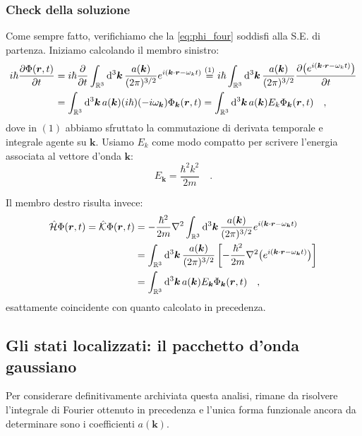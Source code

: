 \subsubsection{Check della soluzione}
Come sempre fatto, verifichiamo che la \eqref{eq:phi_four} soddisfi alla S.E. di partenza. Iniziamo calcolando il membro sinistro:
\[
\begin{aligned}
    i\hbar \pdv{\Phi(\bm{r}, t)}{t} &= i\hbar \pdv{}{t} \int_{\mathbb{R}^3} \dd^3{\bm{k}} \, \frac{a(\bm{k})}{(2\pi)^{3/2}} e^{i(\bm{k} \cdot \bm{r}-\omega_k t)} \overset{(1)}{=} i\hbar \int_{\mathbb{R}^3} \dd^3{\bm{k}} \, \frac{a(\bm{k})}{(2\pi)^{3/2}} \pdv{\big( e^{i(\bm{k} \cdot \bm{r}-\omega_k t)} \big)}{t} \\
    &= \int_{\mathbb{R}^3} \dd^3{\bm{k}} \, a(\bm{k}) (i\hbar )(-i\omega_{\bm{k}}) \Phi_{\bm{k}}(\bm{r}, t) = \int_{\mathbb{R}^3} \dd^3{\bm{k}} \, a(\bm{k}) E_k \Phi_{\bm{k}}(\bm{r}, t) \quad,
\end{aligned}
\]
dove in $(1)$ abbiamo sfruttato la commutazione di derivata temporale e integrale agente su $\bm{k}$. Usiamo $E_k$ come modo compatto per scrivere l'energia associata al vettore d'onda $\bm{k}$:
\[
    E_{\bm{k}} = \frac{\hbar^2 k^2}{2m} \quad.
\]

Il membro destro risulta invece:
\[
\begin{aligned}
    \hat{\mathcal{H}}\Phi(\bm{r}, t) = \hat{\mathcal{K}}\Phi(\bm{r}, t) &= -\frac{\hbar^2}{2m}\nabla^2 \int_{\mathbb{R}^3} \dd^3{\bm{k}} \, \frac{a(\bm{k})}{(2\pi)^{3/2}} e^{i(\bm{k} \cdot \bm{r}-\omega_{\bm{k}} t)}\\
    & = \int_{\mathbb{R}^3} \dd^3{\bm{k}} \, \frac{a(\bm{k})}{(2\pi)^{3/2}} \left[ -\frac{\hbar^2}{2m}\nabla^2 \big( e^{i(\bm{k} \cdot \bm{r}-\omega_{\bm{k}} t)} \big) \right] \\
    &= \int_{\mathbb{R}^3} \dd^3{\bm{k}} \, a(\bm{k}) E_{\bm{k}} \Phi_{\bm{k}}(\bm{r}, t) \quad,
\end{aligned}
\]
esattamente coincidente con quanto calcolato in precedenza.

\subsection{Gli stati localizzati: il pacchetto d'onda gaussiano}
Per considerare definitivamente archiviata questa analisi, rimane da risolvere l'integrale di Fourier ottenuto in precedenza e l'unica forma funzionale ancora da determinare sono i coefficienti $a(\bm{k})$.

